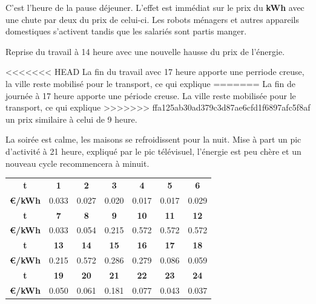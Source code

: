 C'est l'heure de la pause déjeuner. L'effet est immédiat sur le prix du \textbf{kWh} avec une chute par deux du prix
de celui-ci. Les robots ménagers et autres appareils domestiques s'activent tandis que les salariés sont partis manger.

Reprise du travail à 14 heure avec une nouvelle hausse du prix de l'énergie.

<<<<<<< HEAD
La fin du travail avec 17 heure apporte une perriode creuse, la ville reste mobilisé pour le transport, ce qui explique
=======
La fin de journée à 17 heure apporte une période creuse. La ville reste mobilisée pour le transport, ce qui explique
>>>>>>> ffa125ab30ad379c3d87ae6cfd1f6897afc5f8af
un prix similaire à celui de 9 heure.

La soirée est calme, les maisons se refroidissent pour la nuit. Mise à part un pic d'activité à 21 heure, expliqué par le
pic télévisuel, l'énergie est peu chère et un nouveau cycle recommencera à minuit.

\begin{tabular}{ | c | c | c | c | c | c | c | }
  \hline
  \textbf{t} & \textbf{1} & \textbf{2} & \textbf{3} & \textbf{4} & \textbf{5} & \textbf{6} \\
  \textbf{€/kWh} & 0.033 & 0.027 & 0.020 & 0.017 & 0.017 & 0.029 \\
  \hline
  \textbf{t} & \textbf{7} & \textbf{8} & \textbf{9} & \textbf{10} & \textbf{11} & \textbf{12} \\
  \textbf{€/kWh} & 0.033 & 0.054 & 0.215 & 0.572 & 0.572 & 0.572 \\
  \hline
  \textbf{t} & \textbf{13} & \textbf{14} & \textbf{15} & \textbf{16} & \textbf{17} & \textbf{18} \\
  \textbf{€/kWh} & 0.215 & 0.572 & 0.286 & 0.279 & 0.086 & 0.059 \\
  \hline
  \textbf{t} & \textbf{19} & \textbf{20} & \textbf{21} & \textbf{22} & \textbf{23} & \textbf{24} \\
  \textbf{€/kWh} & 0.050 & 0.061 & 0.181 & 0.077 & 0.043 & 0.037 \\
  \hline
\end{tabular}


